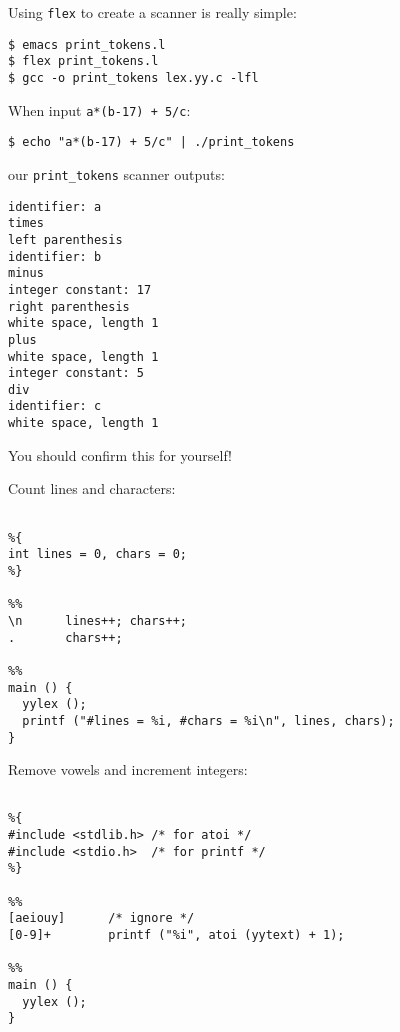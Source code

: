 \begin{slide*}
Using {\tt flex} to create a scanner is really simple:
\begin{scriptsize}
\begin{verbatim}
$ emacs print_tokens.l
$ flex print_tokens.l
$ gcc -o print_tokens lex.yy.c -lfl
\end{verbatim}
\end{scriptsize}

\vspace{1em}

When input {\tt a*(b-17) + 5/c}:

\begin{scriptsize}
\begin{verbatim}
$ echo "a*(b-17) + 5/c" | ./print_tokens
\end{verbatim}
\end{scriptsize}

\vspace{1em}

our {\tt print\_tokens} scanner outputs:

\begin{scriptsize}
\begin{verbatim}
identifier: a
times
left parenthesis
identifier: b
minus
integer constant: 17
right parenthesis
white space, length 1
plus
white space, length 1
integer constant: 5
div
identifier: c
white space, length 1
\end{verbatim}
\end{scriptsize}

\vspace{1em}

You should confirm this for yourself!
\vfil
\end{slide*}

\begin{slide*}
Count lines and characters:
\begin{scriptsize}
\begin{verbatim}

%{
int lines = 0, chars = 0;
%}
 
%%
\n      lines++; chars++;
.       chars++;
 
%%
main () {
  yylex ();
  printf ("#lines = %i, #chars = %i\n", lines, chars);
}

\end{verbatim}
\end{scriptsize}

Remove vowels and increment integers:
\begin{scriptsize}
\begin{verbatim}
 
%{
#include <stdlib.h> /* for atoi */
#include <stdio.h>  /* for printf */
%}

%%
[aeiouy]      /* ignore */
[0-9]+        printf ("%i", atoi (yytext) + 1);

%%
main () {
  yylex ();
}
\end{verbatim}
\end{scriptsize}

\vfil
\end{slide*}


